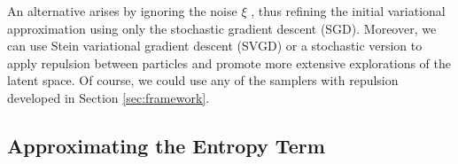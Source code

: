 An alternative arises by ignoring the noise $\xi$ \cite{mandt2017stochastic}, thus refining the initial variational approximation using only the stochastic gradient descent (SGD).
 Moreover, we can use Stein variational gradient descent (SVGD) \cite{liu2016stein} or a stochastic version \cite{gallego2018stochastic} to apply repulsion between particles and promote more extensive explorations of the latent space. %
 Of course, we could use any of the samplers with repulsion developed in Section \ref{sec:framework}.

\subsection{Approximating the Entropy Term}\label{sec:approx}

